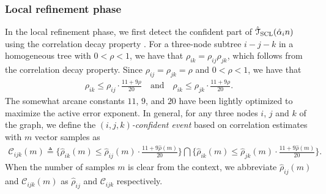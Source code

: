\documentclass[11pt,onecolumn]{article}
\newcommand{\calC}{\mathcal{C}}
\newcommand{\calT}{\mathcal{T}}
\newcommand{\hatcalT}{\hat{\calT}}
\newcommand{\halpha}{\hat{\alpha}}
\newcommand{\hrho}{\hat{\rho}}
\begin{document}
\subsubsection{Local refinement phase}
In the local refinement phase,  we first detect the confident part of $\hatcalT_{\rm{SCL}}(\halpha_{i}n)$ using the correlation decay property \cite{nikolakakis2021predictive}.  
For a three-node subtree $i-j-k$ in a homogeneous tree with $0<\rho<1$, we have that $\rho_{ik}=\rho_{ij}\rho_{jk}$, which follows from the correlation decay property. Since $\rho_{ij}=\rho_{jk}=\rho$ and $0<\rho<1$, we have that
\begin{align}
	\rho_{ik}\leq \rho_{ij}\cdot\frac{11+9\rho}{20}  \quad\mbox{and}\quad \rho_{ik}\leq \rho_{jk}\cdot\frac{ 11+9\rho}{20}.
\end{align}
The somewhat arcane constants $11$, $9$, and $20$ have been lightly optimized to maximize the active error exponent. In general, for any three nodes $i$, $j$ and $k$ of the graph, we define the \emph{$(i,j,k)$-confident event} 
based on correlation estimates with $m$ vector samples as
\begin{align}\label{eq:confevent}
	\calC_{ijk}(m)\triangleq\Big\{\hrho_{ik}(m)\leq \hrho_{ij}(m)\cdot\frac{11+9\hrho(m)}{20}\Big\}\bigcap\Big\{\hrho_{ik}(m)\leq \hrho_{jk}(m)\cdot\frac{11+9\hrho(m)}{20}\Big\}.
\end{align}
When the number of samples $m$ is clear from the context, we abbreviate   $\hrho_{ij}(m)$ and $\calC_{ijk}(m)$ as $\hrho_{ij}$ and $\calC_{ijk}$ respectively.
\end{document}
